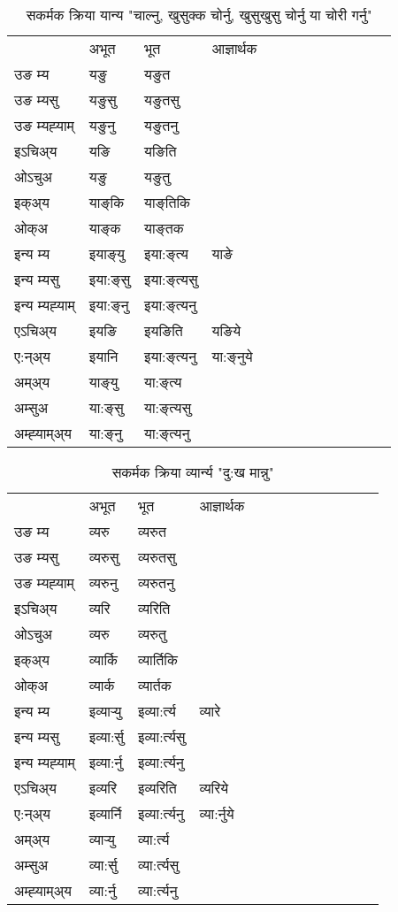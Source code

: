 \begin{table}[H]
\centering
\caption{\label{aŋ.vt} सकर्मक क्रिया  यान्य  "चाल्नु, खुसुक्क चोर्नु, खुसुखुसु चोर्नु या चोरी गर्नु"  }
\begin{tabular}{l|l|l|l|l|l|l|l|l|l|l|l|l}  \toprule
&अभूत & भूत & आज्ञार्थक \\ 
उङ म्य &यङु &यङुत \\ 
उङ म्यसु &यङुसु &यङुतसु \\ 
उङ म्यह्‍याम् &यङुनु &यङुतनु \\ 
इऽचिअ्य  &यङि &यङिति   \\ 
ओऽचुअ &यङु &यङुतु   \\ 
इक्अ्य &याङ्‌कि &याङ्‌तिकि   \\ 
ओक्अ &याङ्‌क &याङ्‌तक   \\ 
इन्य म्य& इयाङ्‌यु  & इया:ङ्‌त्य &याङे  \\ 
इन्य म्यसु & इया:ङ्‌सु  & इया:ङ्‌त्यसु   \\ 
इन्य म्यह्‍याम् & इया:ङ्‌नु  & इया:ङ्‌त्यनु   \\ 
एऽचिअ्य & इयङि & इयङिति &यङिये    \\ 
ए:न्अ्य & इयानि  & इया:ङ्‌त्यनु &या:ङ्‌नुये  \\ 
अम्अ्य & याङ्‌यु  & या:ङ्‌त्य  \\ 
अम्सुअ & या:ङ्‌सु & या:ङ्‌त्यसु  \\ 
अम्ह्‍याम्अ्य & या:ङ्‌नु  & या:ङ्‌त्यनु \\ 
\bottomrule
\end{tabular}
\end{table}


\begin{table}[H]
\centering
\caption{\label{ɛr.vt} सकर्मक क्रिया  व्यार्न्य  "दु:ख मान्नु"  }
\begin{tabular}{l|l|l|l|l|l|l|l|l|l|l|l|l}  \toprule
&अभूत & भूत & आज्ञार्थक \\ 
उङ म्य &व्यरु &व्यरुत \\ 
उङ म्यसु &व्यरुसु &व्यरुतसु \\ 
उङ म्यह्‍याम् &व्यरुनु &व्यरुतनु \\ 
इऽचिअ्य  &व्यरि &व्यरिति   \\ 
ओऽचुअ &व्यरु &व्यरुतु   \\ 
इक्अ्य &व्यार्कि &व्यार्तिकि   \\ 
ओक्अ &व्यार्क &व्यार्तक   \\ 
इन्य म्य& इव्यार्‍यु  & इव्या:र्त्य &व्यारे  \\ 
इन्य म्यसु & इव्या:र्सु  & इव्या:र्त्यसु   \\ 
इन्य म्यह्‍याम् & इव्या:र्नु  & इव्या:र्त्यनु   \\ 
एऽचिअ्य & इव्यरि & इव्यरिति &व्यरिये    \\ 
ए:न्अ्य & इव्यार्नि  & इव्या:र्त्यनु &व्या:र्नुये  \\ 
अम्अ्य & व्यार्‍यु  & व्या:र्त्य  \\ 
अम्सुअ & व्या:र्सु & व्या:र्त्यसु  \\ 
अम्ह्‍याम्अ्य & व्या:र्नु  & व्या:र्त्यनु \\ 
\bottomrule
\end{tabular}
\end{table}


